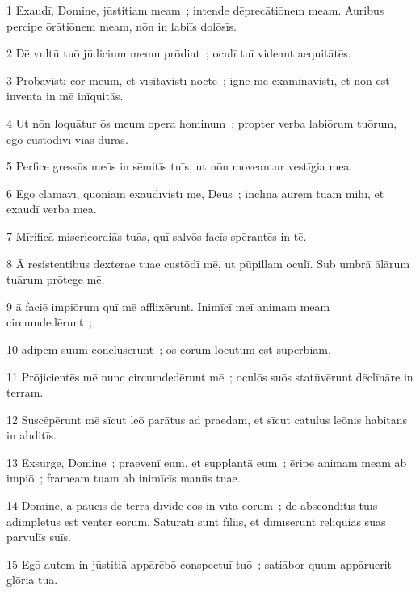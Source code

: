 
\psalmVerse
  {\phantom{00}1}
  {Exaudī, Domine, jūstitiam meam~; intende dēprecātiōnem meam. Auribus percipe ōrātiōnem meam, nōn in labiīs dolōsīs.}


\psalmVerse
  {\phantom{00}2}
  {Dē vultū tuō jūdicium meum prōdiat~; oculī tuī videant aequitātēs.}


\psalmVerse
  {\phantom{00}3}
  {Probāvistī cor meum, et vīsitāvistī nocte~; igne mē exāmināvistī, et nōn est inventa in mē inīquitās.}


\psalmVerse
  {\phantom{00}4}
  {Ut nōn loquātur ōs meum opera hominum~; propter verba labiōrum tuōrum, egō custōdīvī viās dūrās.}


\psalmVerse
  {\phantom{00}5}
  {Perfice gressūs meōs in sēmitīs tuīs, ut nōn moveantur vestīgia mea.}


\psalmVerse
  {\phantom{00}6}
  {Egō clāmāvī, quoniam exaudīvistī mē, Deus~; inclīnā aurem tuam mihī, et exaudī verba mea.}


\psalmVerse
  {\phantom{00}7}
  {Mīrificā misericordiās tuās, quī salvōs facīs spērantēs in tē.}


\psalmVerse
  {\phantom{00}8}
  {Ā resistentibus dexterae tuae custōdī mē, ut pūpillam oculī. Sub umbrā ālārum tuārum prōtege mē,}


\psalmVerse
  {\phantom{00}9}
  {ā faciē impiōrum quī mē afflixērunt. Inimīcī meī animam meam circumdedērunt~;}


\psalmVerse
  {\phantom{0}10}
  {adipem suum conclūsērunt~; ōs eōrum locūtum est superbiam.}


\psalmVerse
  {\phantom{0}11}
  {Prōjicientēs mē nunc circumdedērunt mē~; oculōs suōs statūvērunt dēclīnāre in terram.}


\psalmVerse
  {\phantom{0}12}
  {Suscēpērunt mē sīcut leō parātus ad praedam, et sīcut catulus leōnis habitans in abditīs.}


\psalmVerse
  {\phantom{0}13}
  {Exsurge, Domine~; praevenī eum, et supplantā eum~; ēripe animam meam ab impiō~; frameam tuam ab inimīcīs manūs tuae.}


\psalmVerse
  {\phantom{0}14}
  {Domine, ā paucīs dē terrā dīvide eōs in vītā eōrum~; dē absconditīs tuīs adimplētus est venter eōrum. Saturātī sunt fīliīs, et dīmīsērunt reliquiās suās parvulīs suīs.}


\psalmVerse
  {\phantom{0}15}
  {Egō autem in jūstitiā appārēbō conspectuī tuō~; satiābor quum appāruerit glōria tua.}


